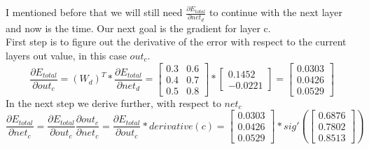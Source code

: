 \documentclass[11pt, halfparskip]{article}
\begin{document}
    \newpage \noindent
    I mentioned before that we will still need $\frac{\partial E_{total}}{\partial net_d}$ to continue with the next layer and now is the time. Our next goal is the gradient for layer c.\\
    First step is to figure out the derivative of the error with respect to the current layers out value, in this case $out_c$.\\
    \[
    	\frac{\partial E_{total}}{\partial out_c} = (W_d)^T * \frac{\partial E_{total}}{\partial net_d} = 
    	\begin{bmatrix}
            	0.3 & 0.6\\
            	0.4 & 0.7\\
            	0.5 & 0.8
            \end{bmatrix}
            *
           \begin{bmatrix}
    		0.1452\\
    		-0.0221
    	\end{bmatrix} 
    	=
    	\begin{bmatrix}
    		0.0303\\
    		0.0426\\
    		0.0529
    	 \end{bmatrix}
    \]
    In the next step we derive further, with respect to $net_c$
    \[
    	\frac{\partial E_{total}}{\partial net_c} = \frac{\partial E_{total}}{\partial out_c}\frac{\partial out_c}{\partial net_c} = \frac{\partial E_{total}}{\partial out_c} * derivative(c) =    	
    	\begin{bmatrix}
    		0.0303\\
    		0.0426\\
    		0.0529
    	 \end{bmatrix}
    	 *
    	 sig'(
    	 \begin{bmatrix}
        		0.6876\\
        		0.7802\\
        		0.8513
        	\end{bmatrix})
    \]
\end{document}
